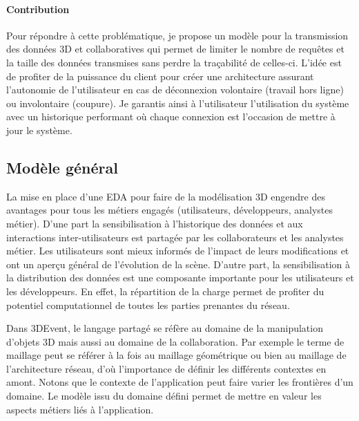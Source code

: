 \paragraph{Contribution}
Pour répondre à cette problématique, je propose un modèle pour la 
transmission des données 3D et collaboratives qui permet de  limiter  le nombre 
de requêtes et la taille des données transmises sans perdre la traçabilité de 
celles-ci. L'idée est de profiter de la puissance du client pour créer une 
architecture assurant l'autonomie de l'utilisateur en cas de déconnexion volontaire 
(travail hors ligne) ou involontaire (coupure). Je garantis ainsi à l'utilisateur 
l'utilisation du système avec un historique performant où chaque connexion est 
l'occasion de mettre à jour le système.


\subsection{Modèle général}
La mise en place d'une \gls{EDA} pour faire de la modélisation 3D engendre des 
avantages pour tous les métiers engagés (utilisateurs, développeurs, analystes 
métier).
D'une part la sensibilisation à l'historique des 
données et aux interactions 
inter-utilisateurs est partagée par les collaborateurs et les analystes métier. Les utilisateurs sont mieux informés de l'impact de leurs modifications et ont un aperçu général de l'évolution de la scène. D'autre part, 
la sensibilisation à la distribution des données est une composante 
importante pour les utilisateurs et les développeurs. En effet, la répartition 
de la charge permet de profiter du potentiel computationnel de toutes les parties 
prenantes du réseau. 

Dans 3DEvent, le langage partagé se réfère au domaine de la manipulation 
d'objets 3D mais aussi au domaine de la collaboration. Par exemple le terme de 
maillage peut se référer à la fois au maillage géométrique ou bien au maillage de 
l'architecture réseau, d'où l'importance de définir les différents contextes en amont. 
Notons que le contexte de l'application peut faire varier les frontières d'un 
domaine. Le modèle issu du domaine défini permet de mettre en valeur les 
aspects métiers liés à l'application.

